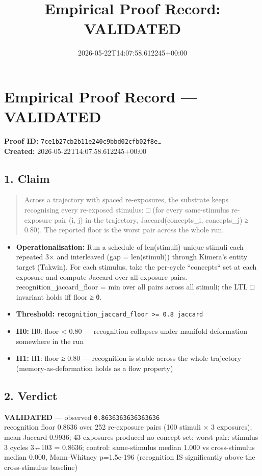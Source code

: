 \documentclass{article}
\title{Empirical Proof Record: VALIDATED}
\date{2026-05-22T14:07:58.612245+00:00}
\begin{document}
\maketitle
\section*{Empirical Proof Record --- \textcolor{validated}{\textbf{VALIDATED}}}
\textbf{Proof ID:} \texttt{7ce1b27cb2b11e240c9bbd02cfb02f8e\dots}\\
\textbf{Created:} 2026-05-22T14:07:58.612245+00:00
\subsection*{1. Claim}
\begin{quote}Across a trajectory with spaced re-exposures, the substrate keeps recognising every re-exposed stimulus: □ (for every same-stimulus re-exposure pair (i, j) in the trajectory, Jaccard(concepts\_i, concepts\_j) ≥ 0.80). The reported floor is the worst pair across the whole run.\end{quote}
\begin{itemize}
\item \textbf{Operationalisation:} Run a schedule of len(stimuli) unique stimuli each repeated 3× and interleaved (gap = len(stimuli)) through Kimera's entity target (Takwin). For each stimulus, take the per-cycle ``concepts`` set at each exposure and compute Jaccard over all exposure pairs. recognition\_jaccard\_floor = min over all pairs across all stimuli; the LTL □ invariant holds iff floor ≥ θ.
\item \textbf{Threshold:} \texttt{recognition\_jaccard\_floor >= 0.8 jaccard}
\item \textbf{H0:} H0: floor < 0.80 — recognition collapses under manifold deformation somewhere in the run
\item \textbf{H1:} H1: floor ≥ 0.80 — recognition is stable across the whole trajectory (memory-as-deformation holds as a flow property)
\end{itemize}
\subsection*{2. Verdict}
\textcolor{validated}{\textbf{VALIDATED}} --- observed \texttt{0.8636363636363636}\\
recognition floor 0.8636 over 252 re-exposure pairs (100 stimuli × 3 exposures); mean Jaccard 0.9936; 43 exposures produced no concept set; worst pair: stimulus 3 cycles 3↔103 = 0.8636; control: same-stimulus median 1.000 vs cross-stimulus median 0.000, Mann-Whitney p=1.5e-196 (recognition IS significantly above the cross-stimulus baseline)
\end{document}
